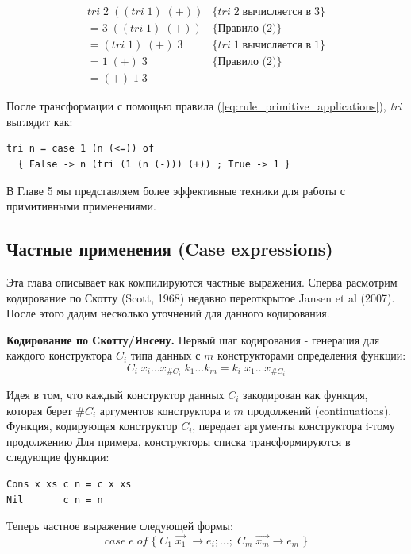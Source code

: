 \documentclass[14pt]{extarticle}
\begin{document}
\begin{align*}
& tri \; 2 \; ((tri \; 1) \; (+)) & \{ tri \; 2 \; \text{вычисляется в} \; 3 \} & \\
& = 3 \; ((tri \; 1) \; (+)) & \{ \text{Правило (2)} \} & \\
& = (tri \; 1) \; (+) \; 3 &  \{ tri \; 1 \; \text{вычисляется в} \; 1 \} & \\
& = 1 \; (+) \; 3 & \{ \text{Правило (2)} \} & \\
& = (+) \; 1 \; 3
\end{align*}

После трансформации с помощью правила (\ref{eq:rule_primitive_applications}), \textit{tri} выглядит как:
\begin{verbatim}
tri n = case 1 (n (<=)) of
  { False -> n (tri (1 (n (-))) (+)) ; True -> 1 }
\end{verbatim}

В Главе 5 мы представляем более эффективные техники для работы с примитивными применениями.

\subsection{Частные применения (Case expressions)}
Эта глава описывает как компилируются частные выражения. Сперва расмотрим кодирование по Скотту (Scott, 1968) недавно переоткрытое Jansen et al (2007). После этого дадим несколько уточнений для данного кодирования.

\textbf{Кодирование по Скотту/Янсену.} Первый шаг кодирования - генерация для каждого конструктора $C_i$ типа данных с $m$ конструкторами определения функции:
\begin{equation} \label{eq:scott_encoding_1}
C_i \; x_i \ldots x_{\#C_i} \; k_1 \ldots k_m = k_i \; x_1 \ldots x_{\#C_i}
\end{equation}

Идея в том, что каждый конструктор данных $C_i$ закодирован как функция, которая берет $\#C_i$ аргументов конструктора и $m$ продолжений (continuations). Функция, кодирующая конструктор $C_i$, передает аргументы конструктора i-тому продолжению Для примера, конструкторы списка трансформируются в следующие функции:

\begin{verbatim}
Cons x xs c n = c x xs
Nil       c n = n
\end{verbatim}

Теперь частное выражение следующей формы:
\begin{equation} \label{eq:scott_encoding_2}
case \; e \; of \; \{ \; C_1 \; \overrightarrow{x_1} \; \rightarrow e_i ; \ldots ; \; C_m \; \overrightarrow{x_m} \rightarrow e_m \; \}
\end{equation}
\end{document}
